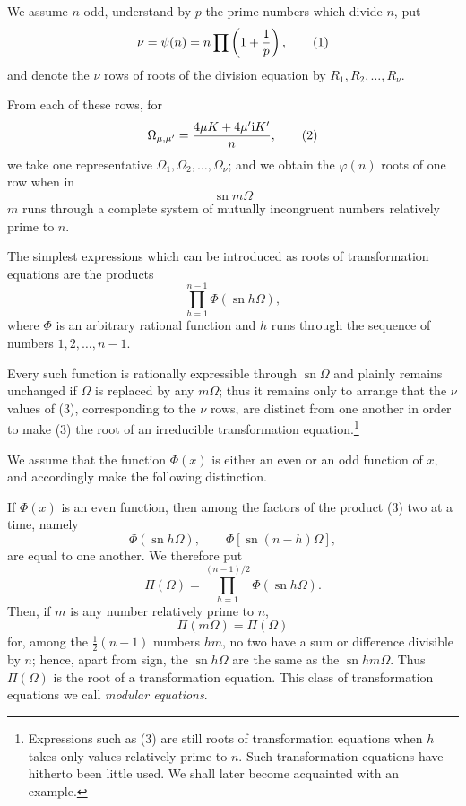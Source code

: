\documentclass[11pt]{article}
\providecommand{\sn}{\operatorname{sn}}
\providecommand{\ii}{\mathrm{i}}
\begin{document}
We assume $n$ odd, understand by $p$ the prime numbers which divide $n$, put
\begin{equation}
\nu=\psi(n)=n\prod\left(1+{1\over p}\right),
\tag{1}
\end{equation}
and denote the $\nu$ rows of roots of the division equation by $R_1,R_2,\ldots,R_\nu$.

From each of these rows, for
\begin{equation}
\Omega_{\mu,\mu'}={4\mu K+4\mu'\ii K'\over n},
\tag{2}
\end{equation}
we take one representative $\Omega_1,\Omega_2,\ldots,\Omega_\nu$; and we obtain the $\varphi(n)$ roots of one row when in
\[
\sn m\Omega
\]
$m$ runs through a complete system of mutually incongruent numbers relatively prime to $n$.

The simplest expressions which can be introduced as roots of transformation equations are the products
\begin{equation}
\prod_{h=1}^{n-1}\Phi(\sn h\Omega),
\tag{3}
\end{equation}
where $\Phi$ is an arbitrary rational function and $h$ runs through the sequence of numbers $1,2,\ldots,n-1$.

Every such function is rationally expressible through $\sn\Omega$ and plainly remains unchanged if $\Omega$ is replaced by any $m\Omega$; thus it remains only to arrange that the $\nu$ values of (3), corresponding to the $\nu$ rows, are distinct from one another in order to make (3) the root of an irreducible transformation equation.\footnote{Expressions such as (3) are still roots of transformation equations when $h$ takes only values relatively prime to $n$. Such transformation equations have hitherto been little used. We shall later become acquainted with an example.}

We assume that the function $\Phi(x)$ is either an even or an odd function of $x$, and accordingly make the following distinction.

If $\Phi(x)$ is an even function, then among the factors of the product (3) two at a time, namely
\begin{equation}
\Phi(\sn h\Omega),\qquad \Phi[\sn(n-h)\Omega],
\tag{4}
\end{equation}
are equal to one another. We therefore put
\begin{equation}
\Pi(\Omega)=\prod_{h=1}^{(n-1)/2}\Phi(\sn h\Omega).
\tag{5}
\end{equation}
Then, if $m$ is any number relatively prime to $n$,
\begin{equation}
\Pi(m\Omega)=\Pi(\Omega)
\tag{6}
\end{equation}
for, among the $\frac12(n-1)$ numbers $hm$, no two have a sum or difference divisible by $n$; hence, apart from sign, the $\sn h\Omega$ are the same as the $\sn hm\Omega$. Thus $\Pi(\Omega)$ is the root of a transformation equation. This class of transformation equations we call \emph{modular equations}.
\end{document}
